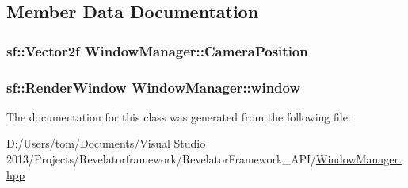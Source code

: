 \subsection{Member Data Documentation}
\hypertarget{class_window_manager_a459ad4d059f5c4f286c24af4550c6101}{
\subsubsection[{Camera\-Position}]{\setlength{\rightskip}{0pt plus 5cm}sf\-::\-Vector2f Window\-Manager\-::\-Camera\-Position\hspace{0.3cm}{\ttfamily [private]}}}\label{class_window_manager_a459ad4d059f5c4f286c24af4550c6101}
\hypertarget{class_window_manager_a61d47c11da0af06b979ec784a21349ea}{
\subsubsection[{window}]{\setlength{\rightskip}{0pt plus 5cm}sf\-::\-Render\-Window Window\-Manager\-::window\hspace{0.3cm}{\ttfamily [private]}}}\label{class_window_manager_a61d47c11da0af06b979ec784a21349ea}


The documentation for this class was generated from the following file\-:\begin{DoxyCompactItemize}
\item 
D\-:/\-Users/tom/\-Documents/\-Visual Studio 2013/\-Projects/\-Revelatorframework/\-Revelator\-Framework\-\_\-\-A\-P\-I/\hyperlink{_window_manager_8hpp}{Window\-Manager.\-hpp}\end{DoxyCompactItemize}
